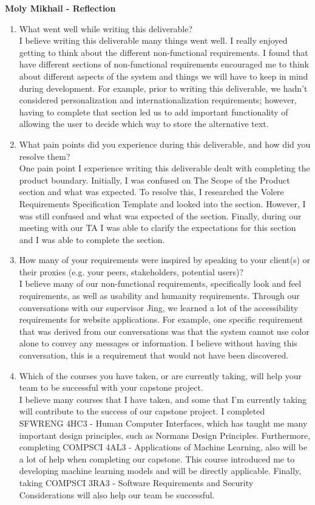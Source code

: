 \textbf{Moly Mikhail  - Reflection}
\begin{enumerate}
  \item What went well while writing this deliverable? \\[1ex]
  I believe writing this deliverable many things went well. I really enjoyed getting to think about the different
  non-functional requirements. I found that have different sections of non-functional requirements encouraged me to think about different 
  aspects of the system and things we will have to keep in mind during development. For example, prior to writing 
  this deliverable, we hadn’t considered personalization and internationalization requirements; however, having to
  complete that section led us to add important functionality of allowing the user to decide which way
  to store the alternative text. 
  
  \item What pain points did you experience during this deliverable, and how did
  you resolve them?\\[1ex]
  One pain point I experience writing this deliverable dealt with completing the product boundary. 
  Initially, I was confused on The Scope of the Product section and what was expected. 
  To resolve this, I researched the Volere Requirements Specification Template and looked into the section. 
  However, I was still confused and what was expected of the section. Finally, during our meeting with
  our TA I was able to clarify the expectations for this section and I was able to complete the section. 
 
  \item How many of your requirements were inspired by speaking to your
  client(s) or their proxies (e.g. your peers, stakeholders, potential users)?\\[1ex]
  I believe many of our non-functional requirements, specifically look and feel 
  requirements, as well as usability and humanity requirements. Through our
  conversations with our supervisor Jing, we learned a lot of the accessibility
  requirements for website applications. For example, one specific requirement 
  that was derived from our conversations was that the system cannot use color alone to convey any messages
  or information. I believe without having this conversation, this is a requirement that would not have been discovered. 
 
  \item Which of the courses you have taken, or are currently taking, will help
  your team to be successful with your capstone project.\\[1ex]
  I believe many courses that I have taken, and some that I’m currently taking will 
  contribute to the success of our capstone project. I completed
  SFWRENG 4HC3 - Human Computer Interfaces, which has taught me many 
  important design principles, such as Normans Design Principles. Furthermore, 
  completing COMPSCI 4AL3 - Applications of Machine Learning, also will be a lot of help when 
  completing our capstone. This course introduced me to developing machine learning models and 
  will be directly applicable. Finally, taking COMPSCI 3RA3 - Software Requirements and Security 
  Considerations will also help our team be successful. 
  

\end{enumerate}
